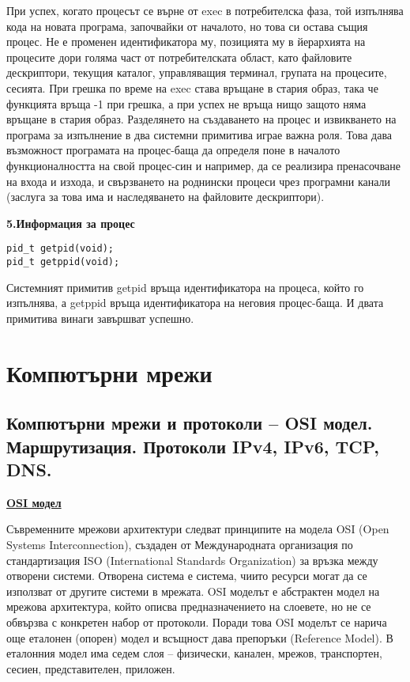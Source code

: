 \documentclass{article}
\begin{document}
При успех, когато процесът се върне от exec в потребителска фаза, той изпълнява кода на новата програма, започвайки от началото,
но това си остава същия процес. Не е променен идентификатора му, позицията му в йерархията на процесите дори голяма част от
потребителската област, като файловите дескриптори, текущия каталог, управляващия терминал, групата на процесите, сесията. При
грешка по време на exec става връщане в стария образ, така че функцията връща -1 при грешка, а при успех не връща нищо защото
няма връщане в стария образ. \newline Разделянето на създаването на процес и извикването на програма за изпълнение в два системни
примитива играе важна роля. Това дава възможност програмата на процес-баща да определя поне в началото функционалността на свой
процес-син и например, да се реализира пренасочване на входа и изхода, и свързването на роднински процеси чрез програмни канали
(заслуга за това има и наследяването на файловите дескриптори).

\textbf{5.Информация за процес}
\begin{lstlisting}[style=CStyle]
pid_t getpid(void);
pid_t getppid(void);
\end{lstlisting}
Системният примитив getpid връща идентификатора на процеса, който го изпълнява, а getppid връща идентификатора на неговия
процес-баща. И двата примитива винаги завършват успешно.



\section*{Компютърни мрежи}

\subsection*{Компютърни мрежи и протоколи – OSI модел. Маршрутизация. Протоколи IPv4, IPv6, TCP, DNS.}

\textbf{\underline{OSI модел}}

Съвременните мрежови архитектури следват принципите на модела OSI (Open Systems Interconnection), създаден от
Международната организация по стандартизация ISO (International Standards Organization) за връзка между отворени
системи. Отворена система е система, чиито ресурси могат да се използват от другите системи в мрежата.
OSI моделът е абстрактен модел на мрежова архитектура, който описва предназначението на слоевете, но не се
обвързва с конкретен набор от протоколи. Поради това OSI моделът се нарича още еталонен (опорен) модел и
всъщност дава препоръки (Reference Model). В еталонния модел има седем слоя – физически, канален, мрежов,
транспортен, сесиен, представителен, приложен.
\end{document}
